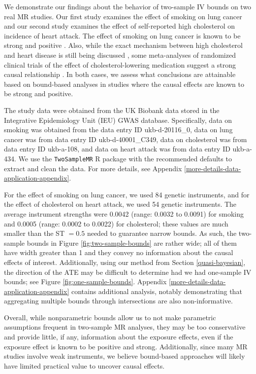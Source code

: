 \documentclass[
]{article}
\theoremstyle{plain}
\begin{document}
We demonstrate our findings about the behavior of two-sample IV bounds on two real MR studies. Our first study examines the effect of smoking on lung cancer and our second study examines the effect of self-reported high cholesterol on incidence of heart attack. The effect of smoking on lung cancer is known to be strong and positive \autocite{united1964smoking}. Also, while the exact mechanism between high cholesterol and heart disease is still being discussed \autocite{holmes_mendelian_2015,richardson_evaluating_2020}, some meta-analyses of randomized clinical trials of the effect of cholesterol-lowering medication suggest a strong causal relationship \autocite{20051267,cholesterol_treatment_trialists_ctt_collaborators_effects_2012}. In both cases, we assess what conclusions are attainable based on bound-based analyses in studies where the causal effects are known to be strong and positive.

The study data were obtained from the UK Biobank data stored in the Integrative Epidemiology Unit (IEU) GWAS database. Specifically, data on smoking was obtained from the data entry ID ukb-d-20116\_0, data on lung cancer was from data entry ID ukb-d-40001\_C349, data on cholesterol was from data entry ID ukb-a-108, and data on heart attack was from data entry ID ukb-a-434. We use the \texttt{TwoSampleMR} R package \autocite{mrbase} with the recommended defaults to extract and clean the data. For more details, see Appendix \ref{more-details-data-application-appendix}.

For the effect of smoking on lung cancer, we used 84 genetic instruments, and for the effect of cholesterol on heart attack, we used 54 genetic instruments. The average instrument strengths were 0.0042 (range: 0.0032 to 0.0091) for smoking and 0.0005 (range: 0.0002 to 0.0022) for cholesterol; these values are much smaller than the ST \(= 0.5\) needed to guarantee narrow bounds. As such, the two-sample bounds in Figure \ref{fig:two-sample-bounds} are rather wide; all of them have width greater than 1 and they convey no information about the causal effects of interest. Additionally, using our method from Section \ref{quasi-bayesian}, the direction of the ATE may be difficult to determine had we had one-sample IV bounds; see Figure \ref{fig:one-sample-bounds}. Appendix \ref{more-details-data-application-appendix} contains additional analysis, notably demonstrating that aggregating multiple bounds through intersections are also non-informative.

Overall, while nonparametric bounds allow us to not make parametric assumptions frequent in two-sample MR analyses, they may be too conservative and provide little, if any, information about the exposure effects, even if the exposure effect is known to be positive and strong. Additionally, since many MR studies involve weak instruments, we believe bound-based approaches will likely have limited practical value to uncover causal effects.
\end{document}
